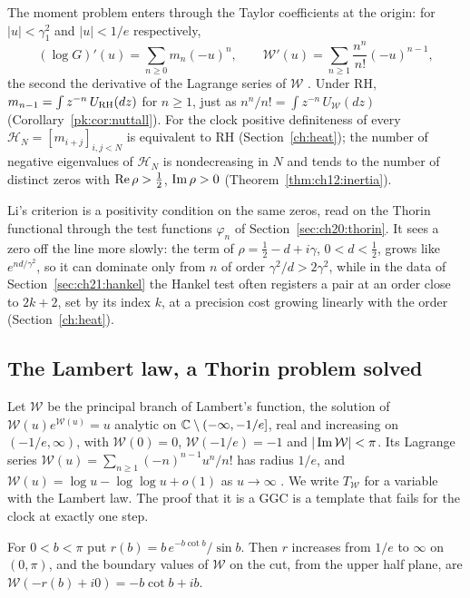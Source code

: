 The moment problem enters through the Taylor coefficients at the origin: for $|u|<\gamma_1^2$ and $|u|<1/e$ respectively,
\[
(\log G)'(u)=\sum_{n\ge0}m_n(-u)^n,\qquad \mathcal W'(u)=\sum_{n\ge1}\frac{n^n}{n!}(-u)^{n-1},
\]
the second the derivative of the Lagrange series of $\mathcal W$ \cite[(3.1)]{Corless96}. Under RH, $m_{n-1}=\int z^{-n}\,U_{\mathrm{RH}}(dz)$ for $n\ge1$, just as $n^n/n!=\int z^{-n}\,U_{\mathcal W}(dz)$ (Corollary~\ref{pk:cor:nuttall}). For the clock positive definiteness of every $\mathcal H_N=[m_{i+j}]_{i,j<N}$ is equivalent to RH (Section~\ref{ch:heat}); the number of negative eigenvalues of $\mathcal H_N$ is nondecreasing in $N$ and tends to the number of distinct zeros with $\operatorname{Re}\rho>\frac12$, $\operatorname{Im}\rho>0$ (Theorem~\ref{thm:ch12:inertia}).

Li's criterion is a positivity condition on the same zeros, read on the Thorin functional through the test functions $\varphi_n$ of Section~\ref{sec:ch20:thorin}. It sees a zero off the line more slowly: the term of $\rho=\frac12-d+i\gamma$, $0<d<\frac12$, grows like $e^{nd/\gamma^2}$, so it can dominate only from $n$ of order $\gamma^2/d>2\gamma^2$, while in the data of Section~\ref{sec:ch21:hankel} the Hankel test often registers a pair at an order close to $2k+2$, set by its index $k$, at a precision cost growing linearly with the order (Section~\ref{ch:heat}).

\subsection{The Lambert law, a Thorin problem solved}\label{pk:sec:lambert}

Let $\mathcal W$ be the principal branch of Lambert's function, the solution of $\mathcal W(u)e^{\mathcal W(u)}=u$ analytic on $\mathbb{C}\setminus(-\infty,-1/e]$, real and increasing on $(-1/e,\infty)$, with $\mathcal W(0)=0$, $\mathcal W(-1/e)=-1$ and $|\operatorname{Im}\mathcal W|<\pi$. Its Lagrange series $\mathcal W(u)=\sum_{n\ge1}(-n)^{n-1}u^n/n!$ has radius $1/e$, and $\mathcal W(u)=\log u-\log\log u+o(1)$ as $u\to\infty$ \cite[(3.1), (4.19)]{Corless96}. We write $T_{\mathcal W}$ for a variable with the Lambert law. The proof that it is a GGC is a template that fails for the clock at exactly one step.

\begin{proposition}\label{pk:prop:bv}
For $0<b<\pi$ put $r(b)=b\,e^{-b\cot b}/\sin b$. Then $r$ increases from $1/e$ to $\infty$ on $(0,\pi)$, and the boundary values of $\mathcal W$ on the cut, from the upper half plane, are $\mathcal W(-r(b)+i0)=-b\cot b+ib$.
\end{proposition}

